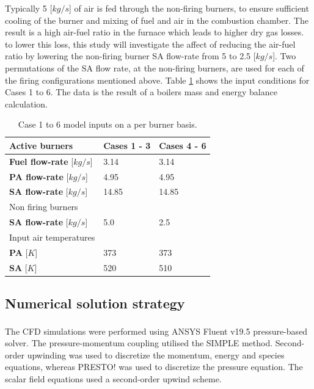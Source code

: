 \documentclass[review]{elsarticle}
\begin{document}
Typically 5 [$kg/s$] of air is fed through the non-firing burners, to ensure sufficient cooling of the burner and mixing of fuel and air in the combustion chamber. The result is a high air-fuel ratio in the furnace which leads to higher dry gas losses. to lower this loss, this study will investigate the affect of reducing the air-fuel ratio by lowering the non-firing burner SA flow-rate from 5 to 2.5 [$kg/s$].
Two permutations of the SA flow rate, at the non-firing burners, are used for each of the firing configurations mentioned above. Table \ref{tbl_case_inputs} shows the input conditions for Cases 1 to 6. The data is the result of a boilers mass and energy balance calculation.

\begin{table}[h!]
\centering
\caption{Case 1 to 6 model inputs on a per burner basis.}
\label{tbl_case_inputs}
\vspace{2mm}
{\tabulinesep=1.2mm
\begin{tabularx}{\textwidth}{p{} p{} l}
\hline
Active burners & \textbf{Cases 1 - 3} & \textbf{Cases 4 - 6}\\
\hline
\textbf{Fuel flow-rate} [$kg/s$]&3.14  &3.14\\
\textbf{PA flow-rate} [$kg/s$]&4.95  &4.95\\
\textbf{SA flow-rate} [$kg/s$]&14.85  &14.85\\
\hline
Non firing burners &  & \\
\hline
\textbf{SA flow-rate} [$kg/s$]&5.0  &2.5\\
\hline
Input air temperatures& &\\
\hline
\textbf{PA} [$K$]&373  &373\\
\textbf{SA} [$K$]&520  &510\\
\hline
\end{tabularx}}
\end{table}

\subsection{Numerical solution strategy} 
The CFD simulations were performed using ANSYS Fluent v19.5\textsuperscript{\textregistered} pressure-based solver. The pressure-momentum coupling utilised the SIMPLE method. Second-order upwinding was used to discretize the momentum, energy and species equations, whereas PRESTO! was used to discretize the pressure equation. The scalar field equations used a second-order upwind scheme.
\end{document}
